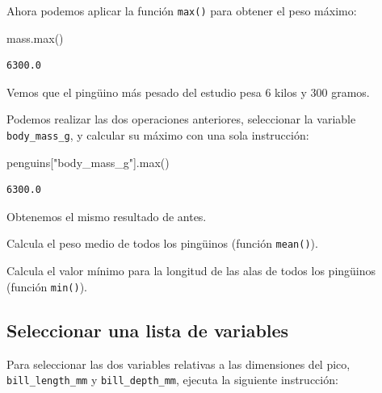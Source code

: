 \documentclass[
  a4paper,
  noprof,
  12pt,
  notoc,
  nosols,
  nobib]{mnye}
\newenvironment{Shaded}{\begin{snugshade}}{\end{snugshade}}
\newcommand{\BuiltInTok}[1]{\textcolor[rgb]{0.00,0.23,0.31}{#1}}
\newcommand{\NormalTok}[1]{\textcolor[rgb]{0.00,0.23,0.31}{#1}}
\newcommand{\StringTok}[1]{\textcolor[rgb]{0.13,0.47,0.30}{#1}}
\renewenvironment{exercise}[1][]{
            \if\relax\detokenize{#1}\relax
                \ex
            \else
                \ex[note={#1}]
            \fi
        }{\endex}
\theoremstyle{definition}
\newtheorem{exercise}{Ejercicio}[section]
\theoremstyle{remark}
\begin{document}
Ahora podemos aplicar la función \texttt{max()} para obtener el peso
máximo:

\begin{Shaded}
\begin{Highlighting}[]
\NormalTok{mass.}\BuiltInTok{max}\NormalTok{()}
\end{Highlighting}
\end{Shaded}

\begin{verbatim}
6300.0
\end{verbatim}

Vemos que el pingüino más pesado del estudio pesa \(6\) kilos y \(300\)
gramos.

Podemos realizar las dos operaciones anteriores, seleccionar la variable
\texttt{body\_mass\_g}, y calcular su máximo con una sola instrucción:

\begin{Shaded}
\begin{Highlighting}[]
\NormalTok{penguins[}\StringTok{"body\_mass\_g"}\NormalTok{].}\BuiltInTok{max}\NormalTok{()}
\end{Highlighting}
\end{Shaded}

\begin{verbatim}
6300.0
\end{verbatim}

Obtenemos el mismo resultado de antes.

\begin{exercise}[]%
\protect\hypertarget{exr-subset-variable-1}{}\label{exr-subset-variable-1}%
Calcula el peso medio de todos los pingüinos (función \texttt{mean()}).

\end{exercise}

\begin{exercise}[]%
\protect\hypertarget{exr-subset-variable-2}{}\label{exr-subset-variable-2}%
Calcula el valor mínimo para la longitud de las alas de todos los
pingüinos (función \texttt{min()}).

\end{exercise}

\subsection{Seleccionar una lista de
variables}\label{sec-subset-several-variables}

Para seleccionar las dos variables relativas a las dimensiones del pico,
\texttt{bill\_length\_mm} y \texttt{bill\_depth\_mm}, ejecuta la
siguiente instrucción:
\end{document}
